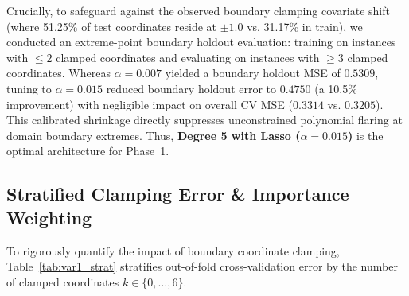 \documentclass[10pt,twocolumn]{article}
\begin{document}
Crucially, to safeguard against the observed boundary clamping covariate shift (where 51.25\% of test coordinates reside at $\pm 1.0$ vs. 31.17\% in train), we conducted an extreme-point boundary holdout evaluation: training on instances with $\le 2$ clamped coordinates and evaluating on instances with $\ge 3$ clamped coordinates. Whereas $\alpha=0.007$ yielded a boundary holdout MSE of $0.5309$, tuning to $\alpha = 0.015$ reduced boundary holdout error to $\mathbf{0.4750}$ (a 10.5\% improvement) with negligible impact on overall CV MSE ($0.3314$ vs. $0.3205$). This calibrated shrinkage directly suppresses unconstrained polynomial flaring at domain boundary extremes. Thus, \textbf{Degree 5 with Lasso ($\alpha = 0.015$)} is the optimal architecture for Phase~1.

\subsection{Stratified Clamping Error \& Importance Weighting}
To rigorously quantify the impact of boundary coordinate clamping, Table~\ref{tab:var1_strat} stratifies out-of-fold cross-validation error by the number of clamped coordinates $k \in \{0, \dots, 6\}$. 

\begin{table}[h]
\centering
\caption{\textbf{Phase 1: Stratified CV Error by Clamped Coordinates}}
\label{tab:var1_strat}
\end{table}
\end{document}
